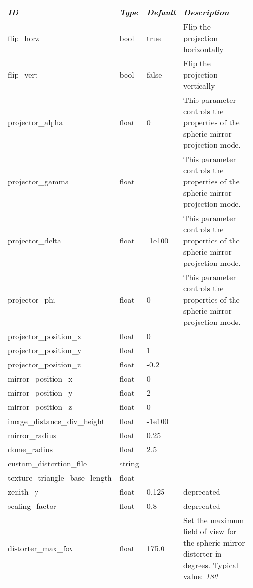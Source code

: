 \begin{longtable}{l|l|l|p{68mm}}\toprule
\emph{ID} & \emph{Type} & \emph{Default}&\emph{Description}\\\midrule
flip\_horz             & bool  &true & Flip the projection horizontally\\%
flip\_vert             & bool  &false& Flip the projection vertically\\%
projector\_alpha       & float &0& This parameter controls the properties of the spheric mirror projection mode.\\%
projector\_gamma       & float && This parameter controls the properties of the spheric mirror projection mode.\\%
projector\_delta       & float &-1e100& This parameter controls the properties of the spheric mirror projection mode.\\%
projector\_phi         & float &0& This parameter controls the properties of the spheric mirror projection mode.\\%
projector\_position\_x & float &0& \\%
projector\_position\_y & float &1& \\%
projector\_position\_z & float &-0.2& \\%
mirror\_position\_x    & float &0& \\%
mirror\_position\_y    & float &2& \\%
mirror\_position\_z    & float &0& \\%
image\_distance\_div\_height&float&-1e100\\%
mirror\_radius         & float &0.25& \\%
dome\_radius           & float &2.5& \\%
custom\_distortion\_file& string& \\%
texture\_triangle\_base\_length&float& \\%
zenith\_y              & float &0.125& deprecated\\%
scaling\_factor        & float &0.8  & deprecated \\%
distorter\_max\_fov    & float & 175.0&Set the maximum field of view for the spheric mirror distorter in degrees. Typical value: \emph{180}\\%

\end{longtable}
